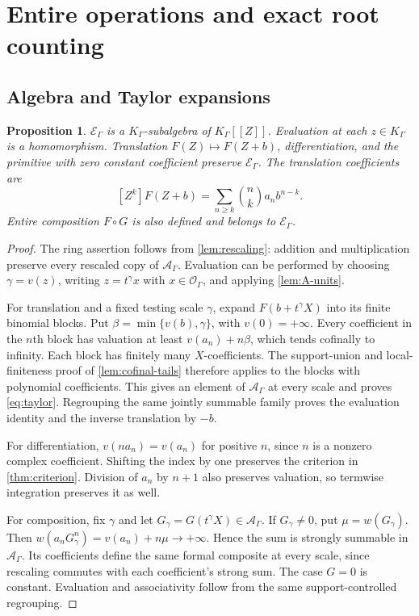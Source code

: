 \documentclass[11pt]{article}
\theoremstyle{plain}
\theoremstyle{plain}
\newtheorem{proposition}[proposition]{Proposition}
\theoremstyle{plain}
\theoremstyle{definition}
\theoremstyle{definition}
\theoremstyle{definition}
\theoremstyle{remark}
\newcommand{\K}{K_\Gamma}\newcommand{\E}{\mathcal E_\Gamma}
\newcommand{\A}{\mathcal A_\Gamma}\newcommand{\OO}{\mathcal O_\Gamma}
\begin{document}
\section{Entire operations and exact root counting}
\label{sec:zeros}

\subsection{Algebra and Taylor expansions}
\begin{proposition}\label{prop:operations}
$\E$ is a $\K$-subalgebra of $\K[[Z]]$. Evaluation at each $z\in\K$
is a homomorphism. Translation $F(Z)\mapsto F(Z+b)$, differentiation,
and the primitive with zero constant coefficient preserve $\E$.
The translation coefficients are
\begin{equation}\label{eq:taylor}
 [Z^k]F(Z+b)=\sum_{n\ge k}\binom nk a_n b^{n-k}.
\end{equation}
Entire composition $F\circ G$ is also defined and belongs to $\E$.
\end{proposition}
\begin{proof}
The ring assertion follows from \cref{lem:rescaling}: addition and
multiplication preserve every rescaled copy of $\A$. Evaluation can
be performed by choosing $\gamma=v(z)$, writing $z=t^\gamma x$ with
$x\in\OO$, and applying \cref{lem:A-units}.

For translation and a fixed testing scale $\gamma$, expand
$F(b+t^\gamma X)$ into its finite binomial blocks. Put
$\beta=\min\{v(b),\gamma\}$, with $v(0)=+\infty$. Every coefficient
in the $n$th block has valuation at least $v(a_n)+n\beta$, which tends
cofinally to infinity. Each block has finitely many $X$-coefficients.
The support-union and local-finiteness proof of
\cref{lem:cofinal-tails} therefore applies to the blocks with polynomial
coefficients. This gives an element of $\A$ at every scale and proves
\eqref{eq:taylor}. Regrouping the same jointly summable family proves
the evaluation identity and the inverse translation by $-b$.

For differentiation, $v(na_n)=v(a_n)$ for positive $n$, since $n$ is a
nonzero complex coefficient. Shifting the index by one preserves the
criterion in \cref{thm:criterion}. Division of $a_n$ by $n+1$ also
preserves valuation, so termwise integration preserves it as well.

For composition, fix $\gamma$ and let $G_\gamma=G(t^\gamma X)\in\A$.
If $G_\gamma\ne0$, put $\mu=w(G_\gamma)$. Then
$w(a_nG_\gamma^n)=v(a_n)+n\mu\to+\infty$. Hence the sum is strongly
summable in $\A$. Its coefficients define the same formal composite
at every scale, since rescaling commutes with each coefficient's
strong sum. The case $G=0$ is constant. Evaluation and associativity
follow from the same support-controlled regrouping.
\end{proof}
\end{document}

